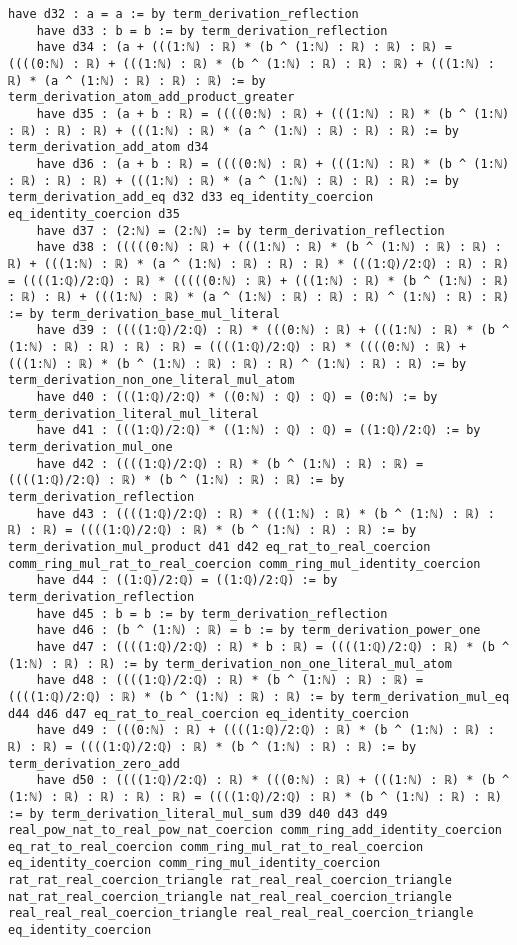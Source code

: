 \documentclass{article}
\begin{document}
\begin{tcolorbox}[colback=white!10, width=\linewidth]
\begin{lstlisting}[language=Lean4]
    have d32 : a = a := by term_derivation_reflection
    have d33 : b = b := by term_derivation_reflection
    have d34 : (a + (((1:ℕ) : ℝ) * (b ^ (1:ℕ) : ℝ) : ℝ) : ℝ) = ((((0:ℕ) : ℝ) + (((1:ℕ) : ℝ) * (b ^ (1:ℕ) : ℝ) : ℝ) : ℝ) + (((1:ℕ) : ℝ) * (a ^ (1:ℕ) : ℝ) : ℝ) : ℝ) := by term_derivation_atom_add_product_greater
    have d35 : (a + b : ℝ) = ((((0:ℕ) : ℝ) + (((1:ℕ) : ℝ) * (b ^ (1:ℕ) : ℝ) : ℝ) : ℝ) + (((1:ℕ) : ℝ) * (a ^ (1:ℕ) : ℝ) : ℝ) : ℝ) := by term_derivation_add_atom d34
    have d36 : (a + b : ℝ) = ((((0:ℕ) : ℝ) + (((1:ℕ) : ℝ) * (b ^ (1:ℕ) : ℝ) : ℝ) : ℝ) + (((1:ℕ) : ℝ) * (a ^ (1:ℕ) : ℝ) : ℝ) : ℝ) := by term_derivation_add_eq d32 d33 eq_identity_coercion eq_identity_coercion d35
    have d37 : (2:ℕ) = (2:ℕ) := by term_derivation_reflection
    have d38 : (((((0:ℕ) : ℝ) + (((1:ℕ) : ℝ) * (b ^ (1:ℕ) : ℝ) : ℝ) : ℝ) + (((1:ℕ) : ℝ) * (a ^ (1:ℕ) : ℝ) : ℝ) : ℝ) * (((1:ℚ)/2:ℚ) : ℝ) : ℝ) = ((((1:ℚ)/2:ℚ) : ℝ) * (((((0:ℕ) : ℝ) + (((1:ℕ) : ℝ) * (b ^ (1:ℕ) : ℝ) : ℝ) : ℝ) + (((1:ℕ) : ℝ) * (a ^ (1:ℕ) : ℝ) : ℝ) : ℝ) ^ (1:ℕ) : ℝ) : ℝ) := by term_derivation_base_mul_literal
    have d39 : ((((1:ℚ)/2:ℚ) : ℝ) * (((0:ℕ) : ℝ) + (((1:ℕ) : ℝ) * (b ^ (1:ℕ) : ℝ) : ℝ) : ℝ) : ℝ) = ((((1:ℚ)/2:ℚ) : ℝ) * ((((0:ℕ) : ℝ) + (((1:ℕ) : ℝ) * (b ^ (1:ℕ) : ℝ) : ℝ) : ℝ) ^ (1:ℕ) : ℝ) : ℝ) := by term_derivation_non_one_literal_mul_atom
    have d40 : (((1:ℚ)/2:ℚ) * ((0:ℕ) : ℚ) : ℚ) = (0:ℕ) := by term_derivation_literal_mul_literal
    have d41 : (((1:ℚ)/2:ℚ) * ((1:ℕ) : ℚ) : ℚ) = ((1:ℚ)/2:ℚ) := by term_derivation_mul_one
    have d42 : ((((1:ℚ)/2:ℚ) : ℝ) * (b ^ (1:ℕ) : ℝ) : ℝ) = ((((1:ℚ)/2:ℚ) : ℝ) * (b ^ (1:ℕ) : ℝ) : ℝ) := by term_derivation_reflection
    have d43 : ((((1:ℚ)/2:ℚ) : ℝ) * (((1:ℕ) : ℝ) * (b ^ (1:ℕ) : ℝ) : ℝ) : ℝ) = ((((1:ℚ)/2:ℚ) : ℝ) * (b ^ (1:ℕ) : ℝ) : ℝ) := by term_derivation_mul_product d41 d42 eq_rat_to_real_coercion comm_ring_mul_rat_to_real_coercion comm_ring_mul_identity_coercion
    have d44 : ((1:ℚ)/2:ℚ) = ((1:ℚ)/2:ℚ) := by term_derivation_reflection
    have d45 : b = b := by term_derivation_reflection
    have d46 : (b ^ (1:ℕ) : ℝ) = b := by term_derivation_power_one
    have d47 : ((((1:ℚ)/2:ℚ) : ℝ) * b : ℝ) = ((((1:ℚ)/2:ℚ) : ℝ) * (b ^ (1:ℕ) : ℝ) : ℝ) := by term_derivation_non_one_literal_mul_atom
    have d48 : ((((1:ℚ)/2:ℚ) : ℝ) * (b ^ (1:ℕ) : ℝ) : ℝ) = ((((1:ℚ)/2:ℚ) : ℝ) * (b ^ (1:ℕ) : ℝ) : ℝ) := by term_derivation_mul_eq d44 d46 d47 eq_rat_to_real_coercion eq_identity_coercion
    have d49 : (((0:ℕ) : ℝ) + ((((1:ℚ)/2:ℚ) : ℝ) * (b ^ (1:ℕ) : ℝ) : ℝ) : ℝ) = ((((1:ℚ)/2:ℚ) : ℝ) * (b ^ (1:ℕ) : ℝ) : ℝ) := by term_derivation_zero_add
    have d50 : ((((1:ℚ)/2:ℚ) : ℝ) * (((0:ℕ) : ℝ) + (((1:ℕ) : ℝ) * (b ^ (1:ℕ) : ℝ) : ℝ) : ℝ) : ℝ) = ((((1:ℚ)/2:ℚ) : ℝ) * (b ^ (1:ℕ) : ℝ) : ℝ) := by term_derivation_literal_mul_sum d39 d40 d43 d49 real_pow_nat_to_real_pow_nat_coercion comm_ring_add_identity_coercion eq_rat_to_real_coercion comm_ring_mul_rat_to_real_coercion eq_identity_coercion comm_ring_mul_identity_coercion rat_rat_real_coercion_triangle rat_real_real_coercion_triangle nat_rat_real_coercion_triangle nat_real_real_coercion_triangle real_real_real_coercion_triangle real_real_real_coercion_triangle eq_identity_coercion

\end{lstlisting}
\end{tcolorbox}
\end{document}

